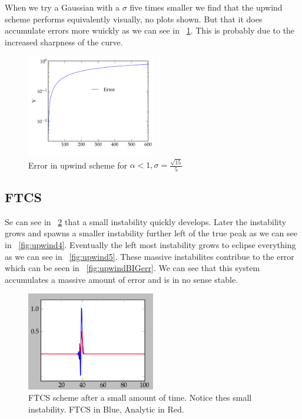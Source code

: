 \documentclass[11pt,letterpaper]{article}
\begin{document}
When we try a Gaussian with a $\sigma$ five times smaller we find that the 
upwind scheme performs equivalently visually, no plots shown. But that it does
accumulate errors more wuickly as we can see in ~\ref{fig:upwindSmallSigma}.
This is probably due to the increased sharpness of the curve. 

\begin{figure}[bth]
\centering
\includegraphics[width=0.5\textwidth]{2c.pdf}
\caption{Error in upwind scheme for $\alpha < 1, \sigma = \frac{\sqrt{15}}{5}$ }
\label{fig:upwindSmallSigma}
\end{figure}

\subsection{FTCS}

Se can see in ~\ref{fig:upwind3} that a small instability quickly develops.
Later the instability grows and spawns a smaller
instability further left of the true peak as we can see in ~\ref{fig:upwind4}. 
Eventually the left most instability grows to eclipse everything as we can see 
in ~\ref{fig:upwind5}. These massive instabilites contribue to the error which
 can be seen in ~\ref{fig:upwindBIGerr}. We can see that this system accumulates
a massive amount of error and is in no sense stable.

\begin{figure}[bth]
\centering
\includegraphics[width=0.5\textwidth]{Upwind3.png}
\caption{FTCS scheme after a small amount of time. Notice thes small instability. FTCS in Blue, Analytic in Red.}
\label{fig:upwind3}
\end{figure}
\end{document}
